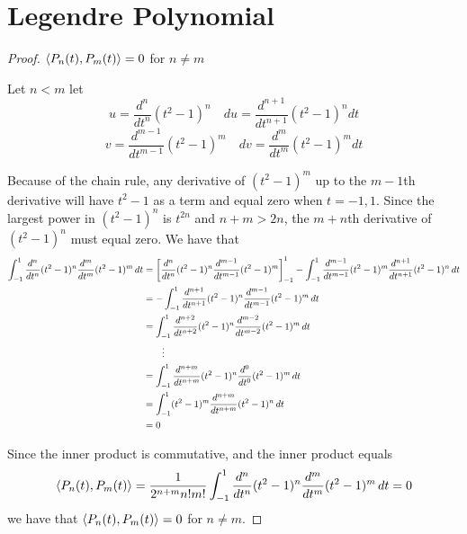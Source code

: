 \section{Legendre Polynomial}
\begin{proof}$\langle P_n(t), P_m(t) \rangle = 0$ for $n \neq m$\gap

    Let $n < m$ let
    \[
        u = \frac{d^n}{dt^n} (t^2 - 1)^n \quad
        du = \frac{d^{n+1}}{dt^{n+1}} (t^2 - 1)^n dt 
    \]
    \[
        v = \frac{d^{m-1}}{dt^{m-1}} (t^2 - 1)^m \quad
        dv = \frac{d^m}{dt^m} (t^2 - 1)^m dt
    \]

    Because of the chain rule, any derivative of $(t^2 - 1)^m$ up to the $m-1$th derivative
    will have $t^2 - 1$ as a term and equal zero when $t = -1, 1$.
    Since the largest power in $(t^2-1)^n$ is $t^{2n}$ and $n+m > 2n$,
    the $m+n$th derivative of $(t^2-1)^n$ must equal zero.
    We have that
    \begin{align*}
        \int_{-1}^{1} \frac{d^n}{dt^n} (t^2 - 1)^n \frac{d^m}{dt^m} (t^2 - 1)^m \,dt
        &= \left[ \frac{d^n}{dt^n} (t^2 - 1)^n \frac{d^{m-1}}{dt^{m-1}} (t^2 - 1)^m \right]_{-1}^{1} - \int_{-1}^{1} \frac{d^{m-1}}{dt^{m-1}} (t^2 - 1)^m \frac{d^{n+1}}{dt^{n+1}} (t^2 - 1)^n \,dt\\
        &= -\int_{-1}^{1} \frac{d^{n+1}}{dt^{n+1}} (t^2 - 1)^n \frac{d^{m-1}}{dt^{m-1}} (t^2 - 1)^m \,dt\\
        &= \int_{-1}^{1} \frac{d^{n+2}}{dt^{n+2}} (t^2 - 1)^n \frac{d^{m-2}}{dt^{m-2}} (t^2 - 1)^m \,dt\\
        &\qquad \vdots\\
        &= \int_{-1}^{1} \frac{d^{n+m}}{dt^{n+m}} (t^2 - 1)^n \frac{d^{0}}{dt^{0}} (t^2 - 1)^m \,dt\\
        &= \int_{-1}^{1} (t^2 - 1)^m \frac{d^{n+m}}{dt^{n+m}} (t^2 - 1)^n \,dt\\
        &= 0
    \end{align*}\gap

    
    Since the inner product is commutative, and the inner product equals
    \[
        \langle P_n(t), P_m(t) \rangle
        =\frac{1}{2^{n+m}n!m!} \int_{-1}^{1} \frac{d^n}{dt^n} (t^2 - 1)^n \frac{d^m}{dt^m} (t^2 - 1)^m \,dt
        = 0
    \]
    we have that $\langle P_n(t), P_m(t) \rangle = 0$ for $n \neq m$.

  
\end{proof}
